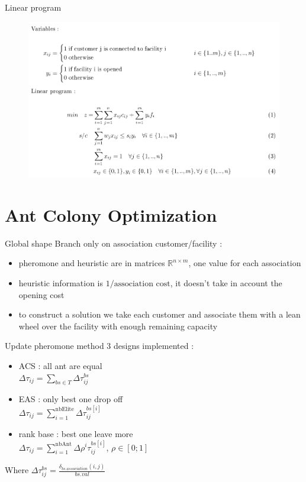 \documentclass{beamer}
\begin{document}
\begin{frame}{Linear program}
    \begin{figure}
    \centering
    \includegraphics[scale=0.32]{model}
\end{figure}
\end{frame}

\section{Ant Colony Optimization}

\begin{frame}{Global shape}
Branch only on association customer/facility :
\begin{itemize}
\item
pheromone and heuristic are in matrices $\mathbb{R}^{n \times m}$, one value for each association
\item
heuristic information is $1/ \text{association cost}$, it doesn't take in account the opening cost
\item
to construct a solution we take each customer and associate them with a lean wheel over the facility with enough remaining capacity
\end{itemize}
\end{frame}

\begin{frame}{Update pheromone method}
3 designs implemented :
\begin{itemize}
\item
ACS : all ant are equal \\
$\Delta \tau_{ij} = \sum \limits_{bs \in T} \Delta \tau_{ij}^{bs}$
\item
EAS : only best one drop off \\
$\Delta \tau_{ij} = \sum \limits_{i = 1}^{\text{nbElite}} \Delta \tau_{ij}^{bs\left[i\right]}$
\item
rank base : best one leave more \\
$\Delta \tau_{ij} = \sum \limits_{i = 1}^{\text{nbAnt}} \Delta \rho^i \tau_{ij}^{bs\left[ i \right] }$, $\rho \in \left[ 0 ; 1 \right] $
\end{itemize}
Where $\Delta \tau_{ij}^{bs} = \frac{\delta_{bs.association}(i,j)}{bs.val}$
\end{frame}
\end{document}
